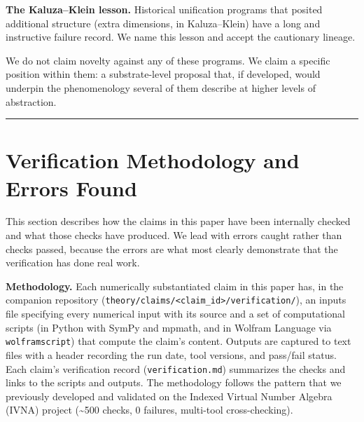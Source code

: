 \documentclass[12pt]{article}
\theoremstyle{definition}
\theoremstyle{remark}
\begin{document}
\textbf{The Kaluza--Klein lesson.} Historical unification programs that
posited additional structure (extra dimensions, in Kaluza--Klein) have a
long and instructive failure record. We name this lesson and accept the
cautionary lineage.

We do not claim novelty against any of these programs. We claim a
specific position within them: a substrate-level proposal that, if
developed, would underpin the phenomenology several of them describe at
higher levels of abstraction.

\begin{center}\rule{0.5\linewidth}{0.5pt}\end{center}

\section{Verification Methodology and Errors Found}\label{sec:verification}

This section describes how the claims in this paper have been internally
checked and what those checks have produced. We lead with errors caught
rather than checks passed, because the errors are what most clearly
demonstrate that the verification has done real work.

\textbf{Methodology.} Each numerically substantiated claim in this paper
has, in the companion repository
(\texttt{theory/claims/\textless{}claim\_id\textgreater{}/verification/}),
an inputs file specifying every numerical input with its source and a
set of computational scripts (in Python with SymPy and mpmath, and in
Wolfram Language via \texttt{wolframscript}) that compute the claim's
content. Outputs are captured to text files with a header recording the
run date, tool versions, and pass/fail status. Each claim's verification
record (\texttt{verification.md}) summarizes the checks and links to the
scripts and outputs. The methodology follows the pattern that we
previously developed and validated on the Indexed Virtual Number Algebra
(IVNA) project (\textasciitilde500 checks, 0 failures, multi-tool
cross-checking).
\end{document}

